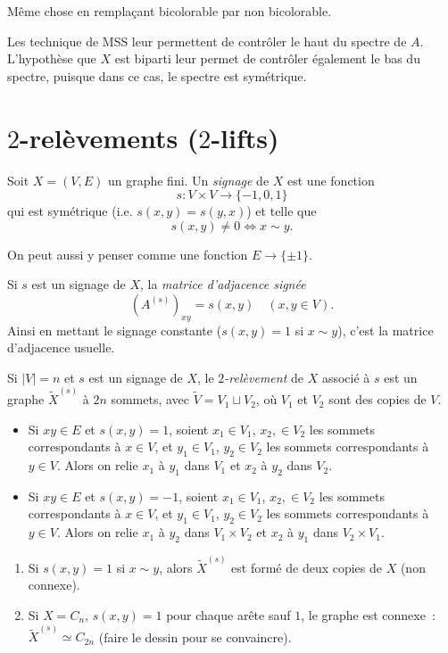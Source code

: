 Même chose en remplaçant bicolorable par non bicolorable.

Les technique de MSS leur permettent de contrôler \og le haut du spectre\fg{} de $A$. L'hypothèse que $X$ est
biparti leur permet de contrôler également le \og bas du spectre\fg{}, puisque dans ce cas, le spectre est
symétrique.


\section{$2$-relèvements (\og $2$-lifts\fg{})}
\label{sec:2-relevements}


\begin{defi}
  Soit $X=(V,E)$ un graphe fini. Un \emph{signage} de $X$ est une fonction 
  \[ s \colon V \times V \to \{-1, 0, 1\} \]
  qui est symétrique (i.e. $s(x,y) = s(y,x)$) et telle que 
  \[ s(x,y) \neq 0 \iff x \sim y. \]
\end{defi}

\begin{rem}
  On peut aussi y penser comme une fonction $E \to \{\pm 1\}$.
\end{rem}

Si $s$ est un signage de $X$, la \emph{matrice d'adjacence signée} 
\[ (A^{(s)})_{xy} = s(x,y) \quad (x,y \in V). \]
Ainsi en mettant le signage constante ($s(x,y) = 1$ si $x \sim y$), c'est la matrice d'adjacence usuelle.

Si $|V| = n$ et $s$ est un signage de $X$, le \emph{$2$-relèvement} de $X$ associé à $s$
est un graphe $\tilde{X}^{(s)}$ à $2n$ sommets, avec $\tilde{V} = V_1 \sqcup V_2$, où $V_1$ et $V_2$ sont des
copies de $V$.
\begin{itemize}
\item Si $xy \in E$ et $s(x,y) = 1$, soient $x_1 \in V_1$, $x_2, \in V_2$ les sommets correspondants à $x \in
  V$, et $y_1 \in V_1$, $y_2 \in V_2$ les sommets correspondants à $y \in V$. Alors on relie $x_1$ à $y_1$
  dans $V_1$ et
  $x_2$ à $y_2$ dans $V_2$.
\item Si $xy \in E$ et $s(x,y) = -1$, soient $x_1 \in V_1$, $x_2, \in V_2$ les sommets correspondants à $x \in
  V$, et $y_1 \in V_1$, $y_2 \in V_2$ les sommets correspondants à $y \in V$. Alors on relie $x_1$ à $y_2$
  dans $V_1 \times V_2$ et
  $x_2$ à $y_1$ dans $V_2 \times V_1$.
\end{itemize}

\begin{exs}
  \begin{enumerate}
  \item Si $s(x,y) = 1$ si $x \sim y$, alors $\tilde{X}^{(s)}$ est formé de deux copies de $X$ (non connexe).
  \item Si $X = C_n$, $s(x,y) = 1$ pour chaque arête sauf $1$, le graphe est connexe~: $\tilde{X}^{(s)} \simeq
    C_{2n}$ (faire le dessin pour se convaincre).
  \end{enumerate}
\end{exs}

